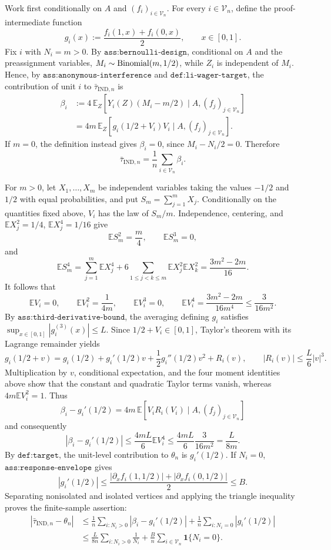 Work first conditionally on \(A\) and \((f_i)_{i\in\mathcal V_n}\).  For every \(i\in\mathcal V_n\), define the proof-intermediate function
\[
g_i(x):=\frac{f_i(1,x)+f_i(0,x)}{2},\qquad x\in[0,1].
\]
Fix \(i\) with \(N_i=m>0\).  By \(\texttt{ass:bernoulli-design}\), conditional on \(A\) and the preassignment variables, \(M_i\sim {\rm Binomial}(m,1/2)\), while \(Z_i\) is independent of \(M_i\).  Hence, by \(\texttt{ass:anonymous-interference}\) and \(\texttt{def:li-wager-target}\), the contribution of unit \(i\) to \(\bar\tau_{\mathrm{IND},n}\) is
\[
\begin{aligned}
\beta_i
&:=4\,\mathbb E_Z\!\left[Y_i(Z)(M_i-m/2)\mid A,(f_j)_{j\in\mathcal V_n}\right]\\
&=4m\,\mathbb E_Z\!\left[g_i(1/2+V_i)V_i\mid A,(f_j)_{j\in\mathcal V_n}\right].
\end{aligned}
\]
If \(m=0\), the definition instead gives \(\beta_i=0\), since \(M_i-N_i/2=0\).  Therefore
\[
\bar\tau_{\mathrm{IND},n}=\frac1n\sum_{i\in\mathcal V_n}\beta_i.
\]

For \(m>0\), let \(X_1,\ldots,X_m\) be independent variables taking the values \(-1/2\) and \(1/2\) with equal probabilities, and put \(S_m=\sum_{j=1}^mX_j\).  Conditionally on the quantities fixed above, \(V_i\) has the law of \(S_m/m\).  Independence, centering, and \(\mathbb E X_j^2=1/4\), \(\mathbb E X_j^4=1/16\) give
\[
\mathbb E S_m^2=\frac m4,\qquad
\mathbb E S_m^3=0,
\]
and
\[
\mathbb E S_m^4
=\sum_{j=1}^m\mathbb E X_j^4
+6\sum_{1\le j<k\le m}\mathbb E X_j^2\mathbb E X_k^2
=\frac{3m^2-2m}{16}.
\]
It follows that
\[
\mathbb E V_i=0,\qquad
\mathbb E V_i^2=\frac1{4m},\qquad
\mathbb E V_i^3=0,\qquad
\mathbb E V_i^4=\frac{3m^2-2m}{16m^4}\le\frac3{16m^2}.
\]
By \(\texttt{ass:third-derivative-bound}\), the averaging defining \(g_i\) satisfies \(\sup_{x\in[0,1]}|g_i^{(3)}(x)|\le L\).  Since \(1/2+V_i\in[0,1]\), Taylor's theorem with its Lagrange remainder yields
\[
g_i(1/2+v)
=g_i(1/2)+g_i'(1/2)v+\frac12g_i''(1/2)v^2+R_i(v),
\qquad |R_i(v)|\le\frac L6|v|^3.
\]
Multiplication by \(v\), conditional expectation, and the four moment identities above show that the constant and quadratic Taylor terms vanish, whereas \(4m\mathbb E V_i^2=1\).  Thus
\[
\beta_i-g_i'(1/2)=4m\,\mathbb E\!\left[V_iR_i(V_i)\mid A,(f_j)_{j\in\mathcal V_n}\right]
\]
and consequently
\[
|\beta_i-g_i'(1/2)|
\le \frac{4mL}{6}\mathbb E V_i^4
\le \frac{4mL}{6}\frac3{16m^2}
=\frac{L}{8m}.
\]
By \(\texttt{def:target}\), the unit-level contribution to \(\theta_n\) is \(g_i'(1/2)\).  If \(N_i=0\), \(\texttt{ass:response-envelope}\) gives
\[
|g_i'(1/2)|
\le\frac{|\partial_x f_i(1,1/2)|+|\partial_x f_i(0,1/2)|}{2}
\le B.
\]
Separating nonisolated and isolated vertices and applying the triangle inequality proves the finite-sample assertion:
\[
\begin{aligned}
|\bar\tau_{\mathrm{IND},n}-\theta_n|
&\le \frac1n\sum_{i:N_i>0}|\beta_i-g_i'(1/2)|
+\frac1n\sum_{i:N_i=0}|g_i'(1/2)|\\
&\le \frac{L}{8n}\sum_{i:N_i>0}\frac1{N_i}
+\frac Bn\sum_{i\in\mathcal V_n}\mathbf 1\{N_i=0\}.
\end{aligned}
\]

